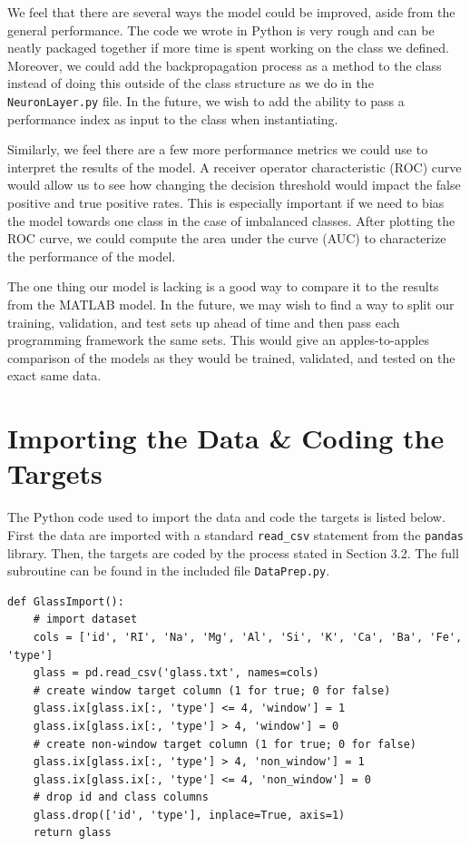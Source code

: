 \documentclass[12pt,halfline,a4paper]{ouparticle}
\begin{document}
We feel that there are several ways the model could be improved, aside from the general performance. The code we wrote in Python is very rough and can be neatly packaged together if more time is spent working on the class we defined. Moreover, we could add the backpropagation process as a method to the class instead of doing this outside of the class structure as we do in the \verb|NeuronLayer.py| file. In the future, we wish to add the ability to pass a performance index as input to the class when instantiating. 

Similarly, we feel there are a few more performance metrics we could use to interpret the results of the model. A receiver operator characteristic (ROC) curve would allow us to see how changing the decision threshold would impact the false positive and true positive rates. This is especially important if we need to bias the model towards one class in the case of imbalanced classes. After plotting the ROC curve, we could compute the area under the curve (AUC) to characterize the performance of the model. 

The one thing our model is lacking is a good way to compare it to the results from the MATLAB model. In the future, we may wish to find a way to split our training, validation, and test sets up ahead of time and then pass each programming framework the same sets. This would give an apples-to-apples comparison of the models as they would be trained, validated, and tested on the exact same data. 

\pagebreak

\printbibliography[heading=bibintoc, title={References}]

\pagebreak

\appendix

\section{Importing the Data \& Coding the Targets}

The Python code used to import the data and code the targets is listed below. First the data are imported with a standard \verb|read_csv| statement from the \verb|pandas| library. Then, the targets are coded by the process stated in Section 3.2. The full subroutine can be found in the included file \verb|DataPrep.py|.

\begin{lstlisting}[style = Python]
def GlassImport():
    # import dataset
    cols = ['id', 'RI', 'Na', 'Mg', 'Al', 'Si', 'K', 'Ca', 'Ba', 'Fe', 'type']
    glass = pd.read_csv('glass.txt', names=cols)
    # create window target column (1 for true; 0 for false)
    glass.ix[glass.ix[:, 'type'] <= 4, 'window'] = 1
    glass.ix[glass.ix[:, 'type'] > 4, 'window'] = 0
    # create non-window target column (1 for true; 0 for false)
    glass.ix[glass.ix[:, 'type'] > 4, 'non_window'] = 1
    glass.ix[glass.ix[:, 'type'] <= 4, 'non_window'] = 0
    # drop id and class columns
    glass.drop(['id', 'type'], inplace=True, axis=1)
    return glass
\end{lstlisting} 
\pagebreak
\end{document}
